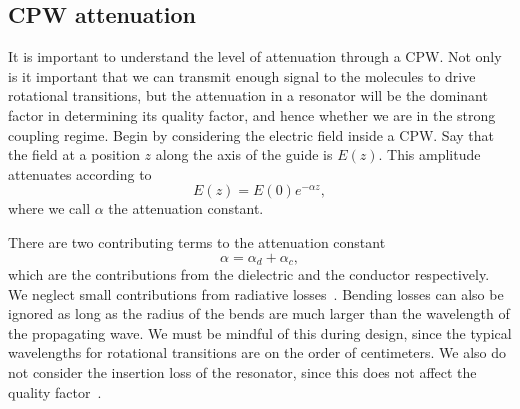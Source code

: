 %

\subsection{CPW attenuation}

It is important to understand the level of attenuation through a CPW. Not only
is it important that we can transmit enough signal to the molecules to drive 
rotational transitions, but the attenuation in a resonator will be the dominant
factor in determining its quality factor, and hence whether we are in the
strong coupling regime. Begin by considering the electric field inside a CPW.
Say that the field at a position $z$ along the axis of the guide is $E(z)$.
This amplitude attenuates according to
%
\begin{equation}
  E(z) = E(0)e^{-\alpha z},
\end{equation}
%
where we call $\alpha$ the attenuation constant.

There are two contributing terms to the attenuation constant
%
\begin{equation}
  \alpha = \alpha_d + \alpha_c,
\end{equation}
%
which are the contributions from the dielectric and the conductor respectively. We
neglect small contributions from radiative losses~\cite{Frankel1991}. Bending
losses can also be ignored as long as the radius of the bends are much larger
than the wavelength of the propagating wave. We must be mindful of this during
design, since the typical wavelengths for rotational transitions are on the
order of centimeters.  We also do not consider the insertion loss of the
resonator, since this does not affect the quality
factor~\cite{doi:10.1063/1.3010859}.

